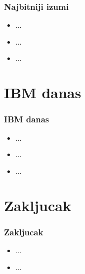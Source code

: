 \documentclass{beamer}
\begin{document}
\begin{frame}[fragile]\frametitle{Najbitniji izumi}
	\begin{itemize}	
		\item ...
		\item ...
		\item ...
	\end{itemize}
\end{frame}

\section{IBM danas}

\begin{frame}[fragile]\frametitle{IBM danas}
	\begin{itemize}	
		\item ...
		\item ...
		\item ...
	\end{itemize}
\end{frame}

\section{Zakljucak}

\begin{frame}[fragile]\frametitle{Zakljucak}
	\begin{itemize}	
		\item ...
		\item ...
	\end{itemize}
\end{frame}
\end{document}
